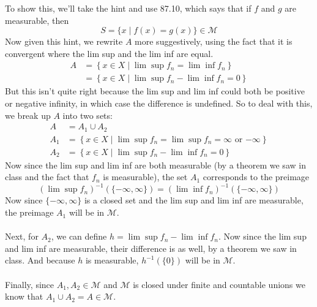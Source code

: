\documentclass[12pt]{article}
\theoremstyle{plain}
\theoremstyle{definition}
\theoremstyle{remark}
\begin{document}
\begin{enumerate}
To show this, we'll take the hint and use 87.10, which says that if $f$ and $g$ are measurable, then 
\[
    S = \{ x \; | \; f(x) = g(x) \} \in \mathscr{M}
\]
Now given this hint, we rewrite $A$ more suggestively, using the fact that it is convergent where the lim sup and the lim inf are equal. 
\begin{align*}
    A &= \left\{ x\in X \; | \; \lim \sup f_n = \lim \inf f_n 
     \right\} \\
    &= \left\{ x\in X \; | \; \lim \sup f_n - \lim \inf f_n = 0
     \right\} 
\end{align*}
But this isn't quite right because the lim sup and lim inf could both be positive or negative infinity, in which case the difference is undefined. So to deal with this, we break up $A$ into two sets:
\begin{align*}
    A &= A_1 \cup A_2 \\
    A_1 &= \left\{ x\in X \; | \; 
        \text{$\lim \sup f_n = \lim\sup f_n = \infty$ or 
        $-\infty$} \right\} \\
    A_2 &= \left\{ x\in X \; | \; \lim \sup f_n - \lim \inf f_n = 0
     \right\} 
\end{align*}
Now since the lim sup and lim inf are both measurable (by a theorem we saw in class and the fact that $f_n$ is measurable), the set $A_1$ corresponds to the preimage 
\[
    \left(\lim \sup f_n\right)^{-1}(\{-\infty, \infty\}) 
    = \left(\lim\inf f_n\right)^{-1}(\{-\infty, \infty\})
\]
Now since $\{-\infty,\infty\}$ is a closed set and the lim sup and lim inf are measurable, the preimage $A_1$ will be in $\mathscr{M}$.
\\
\\
Next, for $A_2$, we can define $h = \lim \sup f_n - \lim \inf f_n$. Now since the lim sup and lim inf are measurable, their difference is as well, by a theorem we saw in class. And because $h$ is measurable, $h^{-1}(\{0\})$ will be in $\mathscr{M}$.
\\
\\
Finally, since $A_1, A_2 \in \mathscr{M}$ and $\mathscr{M}$ is closed under finite and countable unions we know that $A_1 \cup A_2 = A\in\mathscr{M}$.



\end{enumerate}
\end{document}
